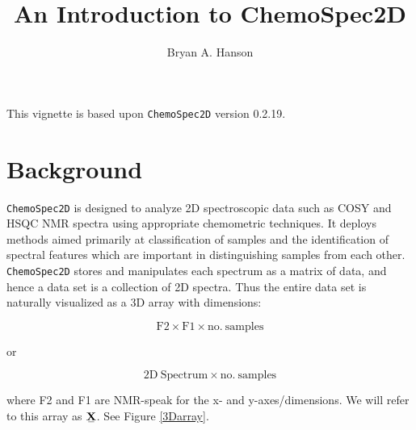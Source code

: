\documentclass[letter,10pt,twocolumn,twoside,printwatermark=false]{pinp}
\title{An Introduction to ChemoSpec2D}
\author[a]{Bryan A. Hanson}
\affil[a]{Dept. of Chemistry \& Biochemistry, DePauw University;
\url{hanson@depauw.edu}}
\begin{document}
\verticaladjustment{-2pt}

\maketitle
\thispagestyle{firststyle}



\newcommand\ubar[1]{\stackunder[1.2pt]{$#1$}{\rule{1.2ex}{.075ex}}}

This vignette is based upon \texttt{ChemoSpec2D} version 0.2.19.

\hypertarget{background}{%
\section{Background}\label{background}}

\texttt{ChemoSpec2D} is designed to analyze 2D spectroscopic data such
as COSY and HSQC NMR spectra using appropriate chemometric techniques.
It deploys methods aimed primarily at classification of samples and the
identification of spectral features which are important in
distinguishing samples from each other. \texttt{ChemoSpec2D} stores and
manipulates each spectrum as a matrix of data, and hence a data set is a
collection of 2D spectra. Thus the entire data set is naturally
visualized as a 3D array with dimensions:

\[
\mathrm{F2} \times \mathrm{F1} \times \mathrm{no. \ samples}
\]

or

\[
\mathrm{2D \ Spectrum} \times \mathrm{no. \ samples}
\]

where F2 and F1 are NMR-speak for the x- and y-axes/dimensions. We will
refer to this array as
\(\stackunder[1.2pt]{$\mathbf{X}$}{\rule{1.2ex}{.075ex}}\). See Figure
\ref{3Darray}.
\end{document}
